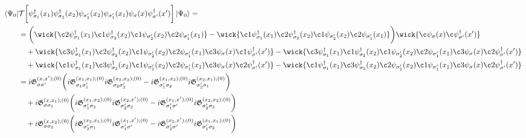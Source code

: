 \documentclass{homework}
\begin{document}
\begin{equation}
    \begin{split}
        \bra{\Psi_0} &\mathcal{T} \bigg[ \psi_{\sigma_1}^\dagger(x_1) \psi_{\sigma_2}^\dagger(x_2) \psi_{\sigma'_2}(x_2) \psi_{\sigma'_1}(x_1) \psi_{\sigma}(x) \psi^\dagger_{\sigma'}(x') \bigg] \ket{\Psi_0} =\\
        &= \bigg({\wick{ \c2\psi_{\sigma_1}^\dagger(x_1) \c1 \psi_{\sigma_2}^\dagger(x_2) \c1 \psi_{\sigma'_2}(x_2) \c2\psi_{\sigma'_1}(x_1)} 
        }-{\wick{ \c1\psi_{\sigma_1}^\dagger(x_1) \c2 \psi_{\sigma_2}^\dagger(x_2) \c1 \psi_{\sigma'_2}(x_2) \c2\psi_{\sigma'_1}(x_1)} 
        }\bigg) \wick{\c  \psi_{\sigma}(x) \c\psi^\dagger_{\sigma'}(x') } \\
        &\blanky \blanky \blanky+ \wick{
        \c3 \psi_{\sigma_1}^\dagger(x_1) 
        \c2 \psi_{\sigma_2}^\dagger(x_2) 
        \c1 \psi_{\sigma'_2}(x_2) 
        \c2 \psi_{\sigma'_1}(x_1) 
        \c3 \psi_{\sigma}(x) 
        \c1 \psi^\dagger_{\sigma'}(x') } - \wick{\c3 \psi_{\sigma_1}^\dagger(x_1)  \c1 \psi_{\sigma_2}^\dagger(x_2)  \c1 \psi_{\sigma'_2}(x_2) \c2 \psi_{\sigma'_1}(x_1) \c3 \psi_{\sigma}(x) \c2 \psi^\dagger_{\sigma'}(x') } \\
        &\blanky \blanky \blanky + \wick{\c1 \psi_{\sigma_1}^\dagger(x_1) \c3 \psi_{\sigma_2}^\dagger(x_2) \c1 \psi_{\sigma'_2}(x_2) \c2 \psi_{\sigma'_1}(x_1) \c3 \psi_{\sigma}(x) \c2 \psi^\dagger_{\sigma'}(x') } - \wick{\c1 \psi_{\sigma_1}^\dagger(x_1) \c3 \psi_{\sigma_2}^\dagger(x_2) \c2 \psi_{\sigma'_2}(x_2) \c1 \psi_{\sigma'_1}(x_1) \c3 \psi_{\sigma}(x) \c2 \psi^\dagger_{\sigma'}(x') } \\
        &= i{\mathfrak{G}_{\sigma \sigma'}^{(x,x'); (0)}} \bigg(i{\mathfrak{G}_{\sigma_1 \sigma'_1}^{(x_1, x_1); (0)}} i{\mathfrak{G}_{\sigma_2 \sigma'_2 }^{(x_2,x_2); (0)}} - i{\mathfrak{G}_{\sigma'_1\sigma_2}^{(x_1, x_2); (0)}} i{\mathfrak{G}_{\sigma'_2 \sigma_1}^{(x_2, x_1); (0)}}\bigg)  \\
        & \blanky \blanky \blanky + i{\mathfrak{G}_{\sigma \sigma_1}^{(x,x_1); (0)}}\bigg(  i{\mathfrak{G}_{\sigma'_1 \sigma_2}^{(x_1,x_2); (0)}} i{\mathfrak{G}_{\sigma'_2\sigma_2}^{(x_2, x'); (0)}} -  i{\mathfrak{G}_{\sigma'_1 \sigma'}^{(x_1, x'); (0)}} i{\mathfrak{G}_{\sigma'_2 \sigma_2}^{(x_2, x_2); (0)}} \bigg) \\
        & \blanky \blanky \blanky + i{\mathfrak{G}_{\sigma \sigma_2}^{(x, x_2);(0)}} \bigg(i{\mathfrak{G}_{\sigma'_2 \sigma_1}^{(x_2, x_1);(0)}}
        i{\mathfrak{G}_{\sigma'_1 \sigma'}^{(x_1, x');(0)}} - 
        i{\mathfrak{G}_{\sigma'_2 \sigma'}^{(x_2, x');(0)}}
        i{\mathfrak{G}_{\sigma_1' \sigma_2}^{(x_1, x_1);(0)}}\bigg) 
    \end{split}
    \label{first_order_contractions}
\end{equation}
\end{document}
